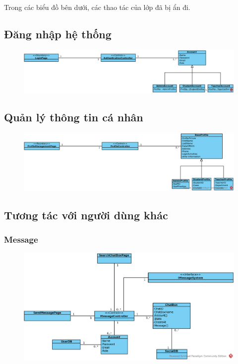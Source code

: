 \documentclass[./../main_file.tex]{subfiles}
\begin{document}
Trong các biểu đồ bên dưới, các thao tác của lớp đã bị ẩn đi.

\subsection{Đăng nhập hệ thống}
\begin{figure}[H]
	\centering
	\includegraphics[width=\linewidth]{./images/define_attribute/ucd_atr_ss_login.eps}
\end{figure}
\subsection{Quản lý thông tin cá nhân}
\begin{figure}[H]
	\centering
	\includegraphics[width=\linewidth]{./images/define_attribute/ucd_atr_ss_profile.eps}
\end{figure}
\subsection{Tương tác với người dùng khác}
\subsubsection{Message}
\begin{figure}[H]
	\centering
	\includegraphics[width=\linewidth]{./images/define_attribute/ucd_atr_message.eps}
\end{figure}
\end{document}

